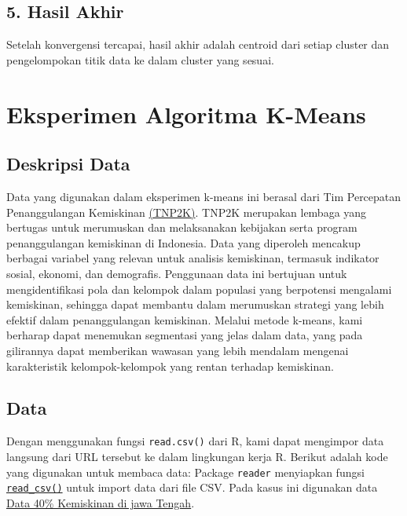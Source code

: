 \documentclass[
  oneside]{book}
\begin{document}
\subsection*{5. Hasil Akhir}\label{hasil-akhir}

Setelah konvergensi tercapai, hasil akhir adalah centroid dari setiap cluster dan pengelompokan titik data ke dalam cluster yang sesuai.

\section{Eksperimen Algoritma K-Means}\label{eksperimen-algoritma-k-means}

\subsection*{Deskripsi Data}\label{deskripsi-data}

Data yang digunakan dalam eksperimen k-means ini berasal dari Tim Percepatan Penanggulangan Kemiskinan \href{https://www.tnp2k.go.id/}{(TNP2K)}. TNP2K merupakan lembaga yang bertugas untuk merumuskan dan melaksanakan kebijakan serta program penanggulangan kemiskinan di Indonesia. Data yang diperoleh mencakup berbagai variabel yang relevan untuk analisis kemiskinan, termasuk indikator sosial, ekonomi, dan demografis. Penggunaan data ini bertujuan untuk mengidentifikasi pola dan kelompok dalam populasi yang berpotensi mengalami kemiskinan, sehingga dapat membantu dalam merumuskan strategi yang lebih efektif dalam penanggulangan kemiskinan. Melalui metode k-means, kami berharap dapat menemukan segmentasi yang jelas dalam data, yang pada gilirannya dapat memberikan wawasan yang lebih mendalam mengenai karakteristik kelompok-kelompok yang rentan terhadap kemiskinan.

\subsection*{Data}\label{data}

Dengan menggunakan fungsi \texttt{read.csv()} dari R, kami dapat mengimpor data langsung dari URL tersebut ke dalam lingkungan kerja R. Berikut adalah kode yang digunakan untuk membaca data:
Package \texttt{reader} menyiapkan fungsi \href{https://readr.tidyverse.org/reference/read_delim.html}{\texttt{read\_csv()}} untuk import data dari file CSV. Pada kasus ini digunakan data \href{https://github.com/dedenistiawan/Dataset/blob/main/BDT.csv}{Data 40\% Kemiskinan di jawa Tengah}.
\end{document}
